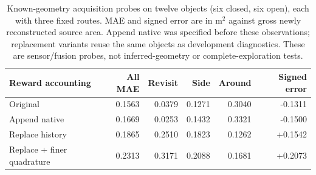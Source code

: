 \begin{table}[!htbp]
\centering\small
\caption{Known-geometry acquisition probes on twelve objects (six closed, six open), each with three fixed routes. MAE and signed error are in m$^2$ against gross newly reconstructed source area. Append native was specified before these observations; replacement variants reuse the same objects as development diagnostics. These are sensor/fusion probes, not inferred-geometry or complete-exploration tests.}
\label{tab:gain-fixture-ablation}
\begin{tabular}{lrrrrr}
\toprule
Reward accounting & All MAE & Revisit & Side & Around & Signed error \\
\midrule
Original & 0.1563 & 0.0379 & 0.1271 & 0.3040 & -0.1311 \\
Append native & 0.1669 & 0.0253 & 0.1432 & 0.3321 & -0.1500 \\
Replace history & 0.1865 & 0.2510 & 0.1823 & 0.1262 & +0.1542 \\
Replace + finer quadrature & 0.2313 & 0.3171 & 0.2088 & 0.1681 & +0.2073 \\
\bottomrule
\end{tabular}
\end{table}
